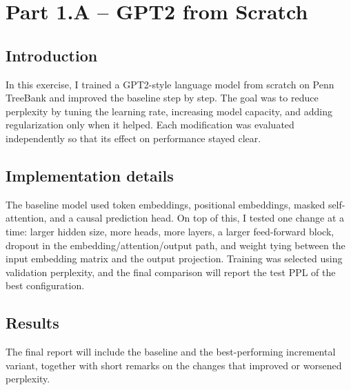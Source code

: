 \section{Part 1.A -- GPT2 from Scratch}

\subsection*{Introduction}
In this exercise, I trained a GPT2-style language model from scratch on Penn TreeBank and improved the baseline step by step. The goal was to reduce perplexity by tuning the learning rate, increasing model capacity, and adding regularization only when it helped. Each modification was evaluated independently so that its effect on performance stayed clear.

\subsection*{Implementation details}
The baseline model used token embeddings, positional embeddings, masked self-attention, and a causal prediction head. On top of this, I tested one change at a time: larger hidden size, more heads, more layers, a larger feed-forward block, dropout in the embedding/attention/output path, and weight tying between the input embedding matrix and the output projection. Training was selected using validation perplexity, and the final comparison will report the test PPL of the best configuration.

\subsection*{Results}
The final report will include the baseline and the best-performing incremental variant, together with short remarks on the changes that improved or worsened perplexity.